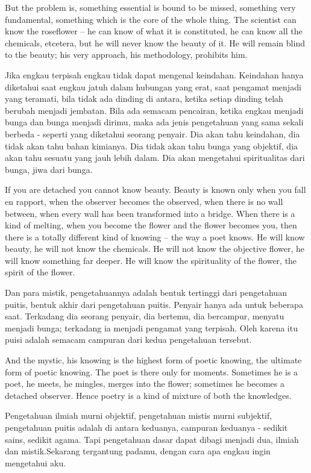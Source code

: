 \english
But the problem is, something essential is bound to be missed, something very
fundamental, something which is the core of the whole thing. The scientist can know the roseflower -- he can know of what it is constituted, he can know all the chemicals, etcetera, but he will never know the beauty of it. He will remain blind to the beauty; his very approach, his methodology, prohibits him.

\bahasa
Jika engkau terpisah engkau tidak dapat mengenal keindahan. Keindahan hanya diketahui saat engkau jatuh dalam hubungan yang erat, saat pengamat menjadi yang teramati, bila tidak ada dinding di antara, ketika setiap dinding telah berubah menjadi jembatan. Bila ada semacam pencairan, ketika engkau menjadi bunga dan bunga menjadi dirimu, maka ada jenis pengetahuan yang sama sekali berbeda - seperti yang diketahui seorang penyair. Dia akan tahu keindahan, dia tidak akan tahu bahan kimianya. Dia tidak akan tahu bunga yang objektif, dia akan tahu sesuatu yang jauh lebih dalam. Dia akan mengetahui spiritualitas dari bunga, jiwa dari bunga.

\english
If you are detached you cannot know beauty. Beauty is known only when you fall en rapport, when the observer becomes the observed, when there is no wall between, when every wall has been transformed into a bridge. When there is a kind of melting, when you become the flower and the flower becomes you, then there is a totally different kind of knowing -- the way a poet knows. He will know beauty, he will not know the chemicals. He will not know the objective flower, he will know something far deeper. He will know the spirituality of the flower, the spirit of the flower.

\bahasa
Dan para mistik, pengetahuannya adalah bentuk tertinggi dari pengetahuan puitis, bentuk akhir dari pengetahuan puitis. Penyair hanya ada untuk beberapa saat. Terkadang dia seorang penyair, dia bertemu, dia bercampur, menyatu menjadi bunga; terkadang ia menjadi pengamat yang terpisah. Oleh karena itu puisi adalah semacam campuran dari kedua pengetahuan tersebut.

\english
And the mystic, his knowing is the highest form of poetic knowing, the ultimate form of poetic knowing. The poet is there only for moments. Sometimes he is a poet, he meets, he mingles, merges into the flower; sometimes he becomes a detached observer. Hence poetry is a kind of mixture of both the knowledges.

\bahasa
Pengetahuan ilmiah murni objektif, pengetahuan mistis murni subjektif, pengetahuan puitis adalah di antara keduanya, campuran keduanya - sedikit sains, sedikit agama. Tapi pengetahuan dasar dapat dibagi menjadi dua, ilmiah dan mistik.Sekarang tergantung padamu, dengan cara apa engkau ingin mengetahui aku.

